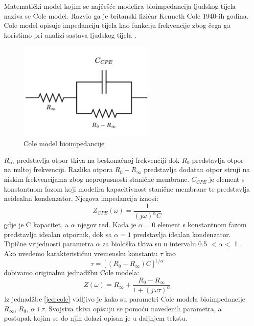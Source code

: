 \documentclass[../diplomski_rad.tex]{subfiles}
\begin{document}
Matematički model kojim se najčešće modelira bioimpedancija ljudskog tijela naziva se Cole model. 
Razvio ga je britanski fizičar Kenneth Cole 1940-ih godina. 
Cole model opisuje impedanciju tijela kao funkciju frekvencije zbog čega ga koristimo pri analizi sastava ljudskog tijela \cite{Freeborn2021}.
\begin{figure}[htb]
    \centering
    \includegraphics[width=0.6\textwidth]{Figures/cole_model.png} 
    \caption{Cole model bioimpedancije}
    \label{slk:cole_model}
\end{figure}
$R_{\infty}$ predstavlja otpor tkiva na beskonačnoj frekvenciji dok $R_{0}$ predstavlja otpor na nultoj frekvenciji. 
Razlika otpora $R_{0}-R_{\infty}$ predstavlja dodatan otpor struji na niskim frekvencijama zbog nepropusnosti stanične membrane. 
$C_{CPE}$ je element s konstantnom fazom koji modelira kapacitivnost stanične membrane 
te predstavlja neidealan kondenzator. Njegova impedancija iznosi: 
\begin{equation}
    \label{jed:cpe}
    Z_{CPE}(\omega) = \frac{1}{(j\omega)^{\alpha}C}
\end{equation} 
gdje je C kapacitet, a $\alpha$ njegov red. Kada je $\alpha = 0$ element s konstantnom fazom predstavlja idealan otpornik, 
dok sa $\alpha = 1$ predstavlja idealan kondenzator. 
Tipične vrijednosti parametra $\alpha$ za biološka tkiva su u intervalu 0.5 $< \alpha <$ 1 \cite{Freeborn2021}.
Ako uvedemo karakterističnu vremensku konstantu $\tau$ kao
\begin{equation}
    \label{jed:time_const}
    \tau = [(R_{0}-R_{\infty})C]^{1/\alpha}
\end{equation}
dobivamo originalnu jednadžbu Cole modela: 
\begin{equation}
    \label{jed:cole}
    Z(\omega) = R_{\infty}+\frac{R_{0}-R_{\infty}}{1+(j\omega\tau)^{\alpha}} 
\end{equation} 
Iz jednadžbe \ref{jed:cole} vidljivo je kako su parametri Cole modela bioimpedancije 
$R_{\infty}$, $R_{0}$, $\alpha$ i $\tau$. 
Svojstva tkiva opisuju se pomoću navedenih parametra, a postupak kojim se do njih dolazi opisan je u daljnjem tekstu.
\end{document}
